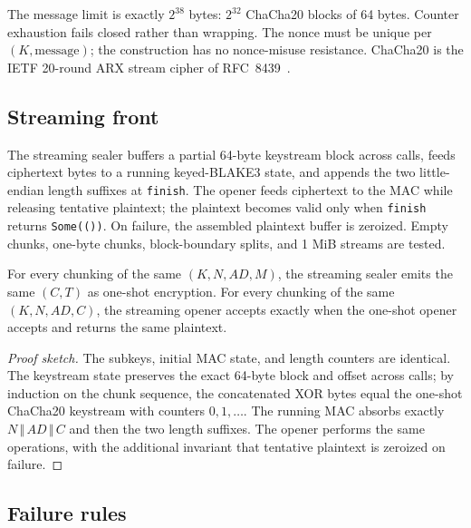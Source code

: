 \documentclass[runningheads]{llncs}
\newcommand{\concat}{\,\Vert\,}
\begin{document}
The message limit is exactly $2^{38}$ bytes: $2^{32}$ ChaCha20 blocks of
64 bytes.  Counter exhaustion fails closed rather than wrapping.  The
nonce must be unique per $(K,\text{message})$; the construction has no
nonce-misuse resistance.  ChaCha20 is the IETF 20-round ARX stream
cipher of RFC~8439~\cite{rfc8439}.

\subsection{Streaming front}

The streaming sealer buffers a partial 64-byte keystream block across
calls, feeds ciphertext bytes to a running keyed-BLAKE3 state, and
appends the two little-endian length suffixes at \texttt{finish}.  The
opener feeds ciphertext to the MAC while releasing tentative plaintext;
the plaintext becomes valid only when \texttt{finish} returns
\texttt{Some(())}.  On failure, the assembled plaintext buffer is
zeroized.  Empty chunks, one-byte chunks, block-boundary splits, and
1 MiB streams are tested.

\begin{proposition}
For every chunking of the same $(K,N,AD,M)$, the streaming sealer emits
the same $(C,T)$ as one-shot encryption.  For every chunking of the same
$(K,N,AD,C)$, the streaming opener accepts exactly when the one-shot
opener accepts and returns the same plaintext.
\end{proposition}

\begin{proof}[Proof sketch]
The subkeys, initial MAC state, and length counters are identical.  The
keystream state preserves the exact 64-byte block and offset across
calls; by induction on the chunk sequence, the concatenated XOR bytes
equal the one-shot ChaCha20 keystream with counters $0,1,\ldots$.  The
running MAC absorbs exactly $N\concat AD\concat C$ and then the two
length suffixes.  The opener performs the same operations, with the
additional invariant that tentative plaintext is zeroized on failure.
\end{proof}

\subsection{Failure rules}
\end{document}
